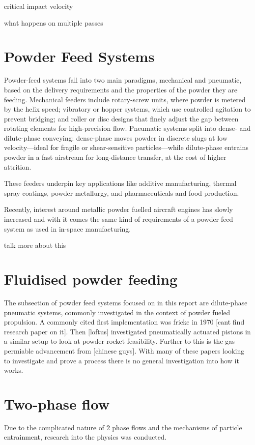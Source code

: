 critical impact velocity

what happens on multiple passes

\newpage
\section{Powder Feed Systems}
Powder-feed systems fall into two main paradigms, mechanical and pneumatic, based on the delivery requirements and the properties of the powder they are feeding. Mechanical feeders include rotary-screw units, where powder is metered by the helix speed; vibratory or hopper systems, which use controlled agitation to prevent bridging; and roller or disc designs that finely adjust the gap between rotating elements for high-precision flow. Pneumatic systems split into dense- and dilute-phase conveying: dense-phase moves powder in discrete slugs at low velocity—ideal for fragile or shear-sensitive particles—while dilute-phase entrains powder in a fast airstream for long-distance transfer, at the cost of higher attrition. 

These feeders underpin key applications like additive manufacturing, thermal spray coatings, powder metallurgy, and pharmaceuticals and food production. 

Recently, interest around metallic powder fuelled aircraft engines has slowly increased and with it comes the same kind of requirements of a powder feed system as used in in-space manufacturing.

talk more about this

\section{Fluidised powder feeding}
The subsection of powder feed systems focused on in this report are dilute-phase pneumatic systems, commonly investigated in the context of powder fueled propulsion. A commonly cited first implementation was fricke in 1970 [cant find research paper on it]. Then [loftus] investigated pneumatically actuated pistons in a similar setup to look at powder rocket feasibility. Further to this is the gas permiable advancement from [chinese guys]. With many of these papers looking to investigate and prove a process there is no general investigation into how it works. 

\newpage
\section{Two-phase flow}
Due to the complicated nature of 2 phase flows and the mechanisms of particle entrainment, research into the physics was conducted.

